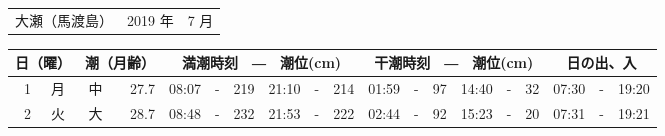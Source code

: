 \documentclass[12pt. a4j]{jsarticle}
\begin{document}
\pagestyle{empty}
 \begin{table}[htbp]
 \begin{center}
 \begin{tabular}{lcc}
 \LARGE{大瀬（馬渡島）}  & \large{ 2019 年 } & \large{  7 月} \\
 \end{tabular}
 \end{center}
    \begin{center}
    \begin{tabular}{|rc|cr|ccrccr|ccrccr|ccc|}
    \hline
            \multicolumn{2}{|c|}{日（曜）} & \multicolumn{2}{c|}{潮（月齢）} & \multicolumn{6}{c|}{満潮時刻　―　潮位(cm)} & \multicolumn{6}{c|}{干潮時刻　―　潮位(cm)} & \multicolumn{3}{c|}{日の出、入} \\
 \hline
 1 & 月 & 中 & 27.7 &  08:07 &-& 219  &  21:10 &-& 214  &  01:59 &-&  97  &  14:40 &-&  32 & 07:30 &-& 19:20 \\
 2 & 火 & 大 & 28.7 &  08:48 &-& 232  &  21:53 &-& 222  &  02:44 &-&  92  &  15:23 &-&  20 & 07:31 &-& 19:21 \\
   \hline
   \end{tabular}
   \end{center}
\end{table}
\newpage
\end{document}
